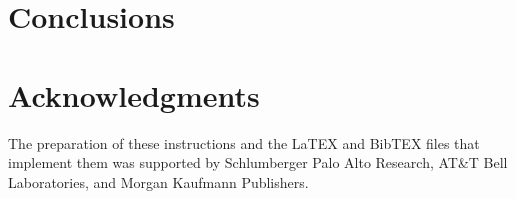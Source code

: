 \documentclass{article}
\begin{document}
\section{Conclusions}

\section*{Acknowledgments}
The preparation of these instructions and the LaTEX and BibTEX files that implement them was supported by Schlumberger Palo Alto Research, AT\&T Bell Laboratories, and Morgan Kaufmann Publishers.


%
%


\end{document}
